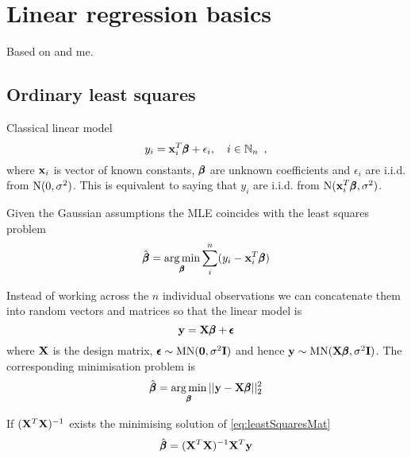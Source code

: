 
\clearpage


\section{Linear regression basics}\label{sec:LinReg}

Based on \cite{Knight2000,Hoerl1970} and me.

\subsection{Ordinary least squares}\label{sec:OlsRegression}

Classical linear model 
\begin{equation}\label{eq:linMod}
y_i = \mathbf{x}_i^T \pmb{\beta} + \epsilon_i, \quad i \in \mathbb{N}_n \enspace,
\end{equation}
where $\mathbf{x}_i$ is vector of known constants, $\pmb{\beta}$ are unknown coefficients and $\epsilon_i$ are i.i.d. from $\text{N}(0,\sigma^2)$.
This is equivalent to saying that $y_i$ are i.i.d. from $\text{N}(\mathbf{x}_i^T \pmb{\beta}, \sigma^2)$.

Given the Gaussian assumptions the MLE coincides with the least squares problem
\begin{equation}\label{eq:leastSquares}
\hat{\pmb{\beta}} = \operatorname*{arg\,min}_{\pmb{\beta}} \sum_i^n (y_i - \mathbf{x}_i^T \pmb{\beta})
\end{equation}

Instead of working across the $n$ individual observations we can concatenate them into random vectors and matrices so that the linear model is
\begin{equation}\label{eq:linModMat}
\mathbf{y} = \mathbf{X} \pmb{\beta} + \pmb{\epsilon} 
\end{equation}
where $\mathbf{X}$ is the design matrix, $\pmb{\epsilon} \sim \text{MN}(\mathbf{0},\sigma^2 \mathbf{I})$ and hence $\mathbf{y} \sim \text{MN}(\mathbf{X} \pmb{\beta}, \sigma^2 \mathbf{I})$.
The corresponding minimisation problem is 
\begin{equation}\label{eq:leastSquaresMat}
\hat{\pmb{\beta}} = \operatorname*{arg\,min}_{\pmb{\beta}} ||\mathbf{y} - \mathbf{X} \pmb{\beta}||_2^2
\end{equation}

If $(\mathbf{X}^T \mathbf{X})^{-1}$ exists the minimising solution of \eqref{eq:leastSquaresMat}
\begin{equation}\label{eq:OLS}
\hat{\pmb{\beta}} = (\mathbf{X}^T \mathbf{X})^{-1} \mathbf{X}^T \mathbf{y}
\end{equation}

